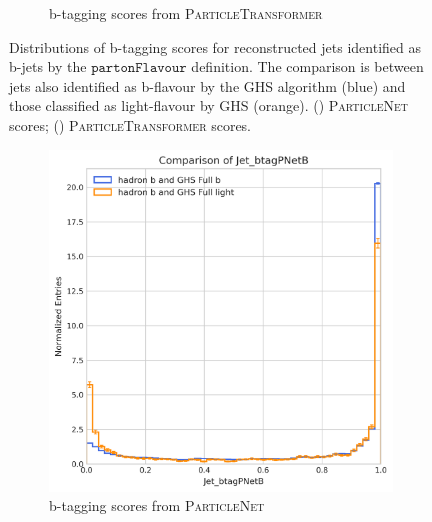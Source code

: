 \documentclass[10pt,twocolumn]{article}
\newcommand*{\parFlav}{\texttt{partonFlavour}}
\begin{document}
\begin{figure}[!htbp]
\begin{subfigure}[t]{0.48\textwidth}
        \caption{b-tagging scores from \textsc{ParticleTransformer}}
        \label{fig:jet_btagParT_full_b_parton_b}
    \end{subfigure}
    \caption{Distributions of b-tagging scores for reconstructed jets identified as b-jets by the $\parFlav$ definition. The comparison is between jets also identified as b-flavour by the GHS algorithm (blue) and those classified as light-flavour by GHS (orange). () \textsc{ParticleNet} scores; () \textsc{ParticleTransformer} scores.}
    \label{fig:jet_btag_full_b_parton_b}
\end{figure}

\begin{figure}[!htbp]
    \centering
    \begin{subfigure}[t]{0.48\textwidth}
        \centering
        \includegraphics[width=\textwidth]{images/compare_btagPNetB_GHSFull_light_vs_b_filter_hadronFlavour_5.png}
        \caption{b-tagging scores from \textsc{ParticleNet}}
        \label{fig:jet_btagPNet_full_b_hadron_b}
    \end{subfigure}
    \hfill
    \begin{subfigure}[t]{0.48\textwidth}
        \centering

\end{subfigure}
\end{figure}
\end{document}
